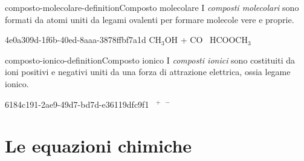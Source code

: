 \documentclass[preview]{standalone}
\begin{document}

\begin{snippetdefinition}{composto-molecolare-definition}{Composto molecolare}
    I \textit{composti molecolari} sono formati da atomi uniti da legami ovalenti per
    formare molecole vere e proprie.
\end{snippetdefinition}


\begin{snippet}{4e0a309d-1f6b-40ed-8aaa-3878ffbf7a1d}
    CH$_3$OH + CO \textrightarrow\ HCOOCH$_3$
\end{snippet}

\begin{snippetdefinition}{composto-ionico-definition}{Composto ionico}
    I \textit{composti ionici} sono costituiti da ioni positivi e negativi
    uniti da una forza di attrazione elettrica, ossia legame ionico.
\end{snippetdefinition}


\begin{snippet}{6184c191-2ae9-49d7-bd7d-e36119dfc9f1}
     \textrightarrow\ 
    $^+$\
    \chemleft[\chemfig{\Charge{90=\|,0=\|,-90=\|,180=\|}{Cl}}\chemright]$^-$
\end{snippet}

\section{Le equazioni chimiche}
\end{document}
